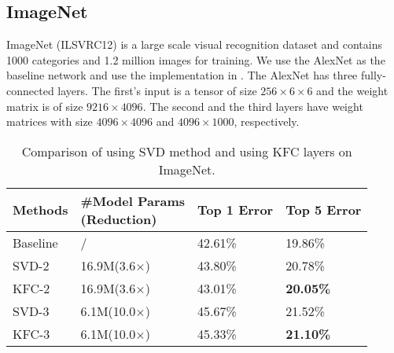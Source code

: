 \documentclass{article}
\begin{document}
\subsection{ImageNet}
ImageNet (ILSVRC12) \cite{ILSVRC15} is a large scale visual recognition dataset and contains 1000 categories and 1.2 million images for training. We
use the AlexNet \cite{krizhevsky2012imagenet} as the baseline network and use the implementation in \cite{ding2014theano}. The AlexNet has three
fully-connected layers. The first's input is a tensor of size $256\times 6 \times 6$ and the weight matrix is of size $9216\times 4096$. The second
and the third layers have weight matrices with size $4096\times 4096$ and $4096 \times 1000$, respectively.
\begin{table}[!ht] \centering \small
\caption{Comparison of using SVD method and using KFC layers on ImageNet.}
\centering
\begin{tabular}{p{1.5cm} p{2cm} p{1.6cm} p{1.6cm}}
    \toprule \parbox[c]{\hsize}{Methods} & \parbox[]{2cm}{\#Model Params\\(Reduction)} & Top 1 Error & Top 5 Error\\
    \midrule Baseline& / & 42.61\% & 19.86\% \\
    \hline
    \midrule SVD-2 & 16.9M(3.6$\times$) & 43.80\% & 20.78\% \\
    \midrule KFC-2 & 16.9M(3.6$\times$) & 43.01\% & \textbf{20.05\%} \\
    \hline
    \midrule SVD-3 & 6.1M(10.0$\times$) & 45.67\% & 21.52\% \\
    \midrule KFC-3 & 6.1M(10.0$\times$) & 45.33\% & \textbf{21.10\%} \\
\hline
\end{tabular}
\label{tab:imagenet}
\end{table}
\end{document}
